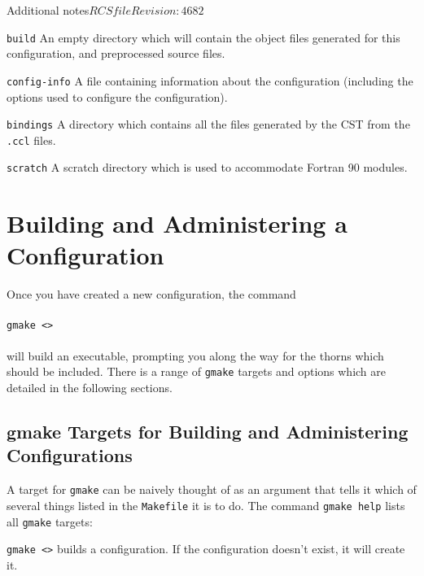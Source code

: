 \begin{cactuspart}{Additional notes}{$RCSfile$}{$Revision: 4682 $}
\begin{Lentry}
\item [\texttt{build}]
An empty directory which will contain the object files generated for this
configuration, and preprocessed source files.

\item [\texttt{config-info}]
A file containing information about the configuration (including the options used to configure the configuration).

\item [\texttt{bindings}] A directory which contains all the files
generated by the CST from the \texttt{.ccl} files.

\item [\texttt{scratch}]
A scratch directory which is used to accommodate Fortran 90 modules.

\end{Lentry}


\section{Building and Administering a Configuration}
\label{sec:buanadaco}

Once you have created a new configuration, the command
\\ \\
\texttt{gmake <>}
\\ \\
will build an executable, prompting you along the way for the
thorns which should be included. There is a range of \texttt{gmake}
targets and options which are detailed in the following sections.

\subsection{gmake Targets for Building and Administering Configurations}
\label{sec:gmtafobuanadco}

A target for \texttt{gmake} can be naively thought of as an argument
that tells it which of several things listed in the \texttt{Makefile} it
is to do. The command \texttt{gmake help} lists all \texttt{gmake} targets:

\begin{Lentry}

\item [\texttt{gmake <\var{config}>}]
        builds a configuration. If the configuration doesn't exist,
        it will create it.


\end{Lentry}
\end{cactuspart}
